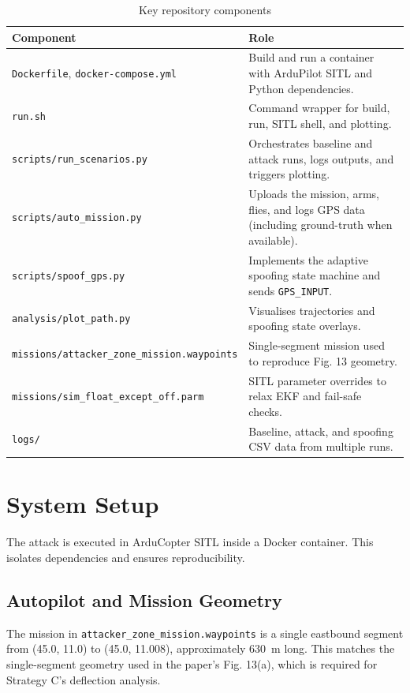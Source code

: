 \documentclass[12pt, a4paper]{article}
\begin{document}
\begin{table}[H]
  \centering
  \begin{tabularx}{\textwidth}{lX}
    \toprule
    \textbf{Component} & \textbf{Role} \\
    \midrule
    \texttt{Dockerfile}, \texttt{docker-compose.yml} & Build and run a container with ArduPilot SITL and Python dependencies. \\
    \texttt{run.sh} & Command wrapper for build, run, SITL shell, and plotting. \\
    \texttt{scripts/run\_scenarios.py} & Orchestrates baseline and attack runs, logs outputs, and triggers plotting. \\
    \texttt{scripts/auto\_mission.py} & Uploads the mission, arms, flies, and logs GPS data (including ground-truth when available). \\
    \texttt{scripts/spoof\_gps.py} & Implements the adaptive spoofing state machine and sends \texttt{GPS\_INPUT}. \\
    \texttt{analysis/plot\_path.py} & Visualises trajectories and spoofing state overlays. \\
    \texttt{missions/attacker\_zone\_mission.waypoints} & Single-segment mission used to reproduce Fig. 13 geometry. \\
    \texttt{missions/sim\_float\_except\_off.parm} & SITL parameter overrides to relax EKF and fail-safe checks. \\
    \texttt{logs/} & Baseline, attack, and spoofing CSV data from multiple runs. \\
    \bottomrule
  \end{tabularx}
  \caption{Key repository components}
  \label{tab:repo}
\end{table}

\section{System Setup}

The attack is executed in ArduCopter SITL inside a Docker container. This isolates dependencies and ensures reproducibility.

\subsection{Autopilot and Mission Geometry}
The mission in \texttt{attacker\_zone\_mission.waypoints} is a single eastbound segment from (45.0, 11.0) to (45.0, 11.008), approximately 630~m long. This matches the single-segment geometry used in the paper's Fig. 13(a), which is required for Strategy C's deflection analysis.
\end{document}
